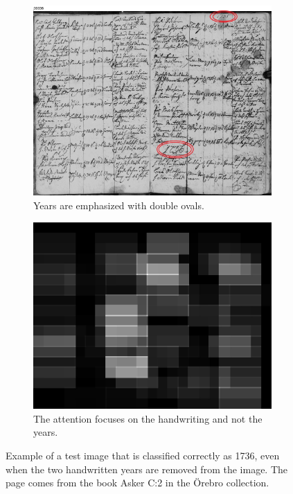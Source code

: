 \begin{figure}
    \centering
    \begin{subfigure}[c]{1.0\textwidth}
        \centering
        \includegraphics[scale=0.5]{resources/Edited/emph_S3HT-64P3-2GW.jpg}
        \caption{Years are emphasized with double ovals.}
    \end{subfigure}
    \begin{subfigure}[c]{1.0\textwidth}
        \centering
        \includegraphics{resources/Edited/Orig_att/att_S3HT-64P3-2GW.jpg}
        \caption{The attention focuses on the handwriting and not the years.}
    \end{subfigure}
    \caption{Example of a test image that is classified correctly as 1736, even when the two handwritten years are removed from the image. The page comes from the book Asker C:2 in the Örebro collection.}
    \label{fig:edited}
\end{figure}